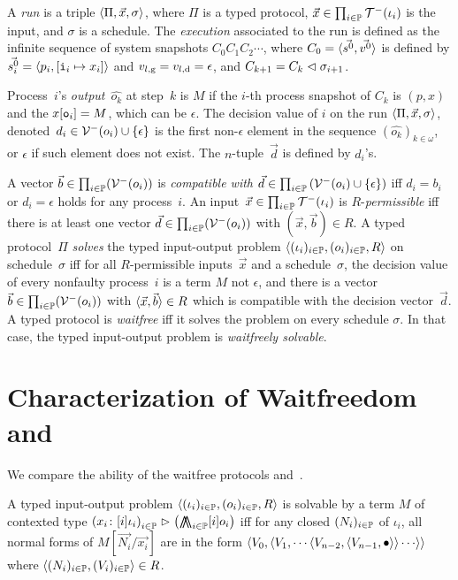 A \textit{run} is a triple $\langle{\Pi, \vec x, \sigma}\rangle$,
where $\Pi$ is a typed protocol,
$\vec x \in \prod_{i\in \mathbb{P}} \mathcal{T}^-(\iota_i)$ is the input,
and $\sigma$ is a schedule.
The \textit{execution} associated to the run
is defined as the infinite sequence of system snapshots
$C_0C_1C_2\cdots$, where $C_0 = \langle{\vec{s^0}, \vec{v^0}}\rangle$ is
defined by $\vec{s^0_i} = \langle{p_i, [\texttt{i}_i\mapsto x_i]}\rangle$ and
${v}_{l, \mathrm g}  = {v}_{l, \mathrm d} = \epsilon$,
and $C_{k+1} = C_{k}\vartriangleleft
\sigma_{i+1}$.

Process~$i$'s \textit{output}~$\hat{o_k}$ at step~$k$ is
$M$ if the $i$-th process snapshot of $C_k$ is
$(p, x)$ and the $x[\texttt{o}_i] = M$, which can be $\epsilon$.
The decision value of $i$ on the run $\langle{\Pi,\vec x,\sigma}\rangle$,
denoted~$d_i \in \mathcal{V}^-(o_i)\cup\{\epsilon\}$
 is the first non-$\epsilon$ element in the sequence
 $\left(\hat{o_k}\right)_{k\in\omega}$,
 or
$\epsilon$ if such element does not exist.
The $n$-tuple~$\vec d$ is defined by $d_i$'s.

A vector $\vec b\in \prod_{i\in \mathbb{P}}(\mathcal{V}^-(o_i))$
is \textit{compatible with} $\vec d \in \prod_{i\in
\mathbb{P}}\left(\mathcal{V}^-(o_i)\cup\{\epsilon\}\right)$ iff
$d_i = b_i$ or $d_i = \epsilon$ holds for any process~$i$.
An input~$\vec x\in \prod_{i\in \mathbb{P}}\mathcal{T}^-(\iota_i)$
is \linebreak[2] $R$-\textit{permissible} iff there is at least one
vector $\vec d\in \prod_{i\in \mathbb{P}}(\mathcal{V}^-(o_i))$ with $(\vec x, \vec b)\in R$.
A typed protocol~$\Pi$ \textit{solves} the typed input-output problem
  $\langle{(\iota_i)_{i\in \mathbb{P}}, (o_i)_{i\in \mathbb{P}}, R}\rangle$ on
schedule~$\sigma$ iff for all $R$-permissible inputs~$\vec x$ and a
schedule~$\sigma$,
 the decision value of every nonfaulty process~$i$ is a term
       $M$ not $\epsilon$, and
 there is a vector $\vec b\in \prod_{i\in \mathbb{P}}(\mathcal{V}^- (o_i))$
with $\langle{\vec x, \vec b}\rangle \in R$ which is compatible with the
 decision vector~$\vec d$.
A typed protocol is \textit{waitfree} iff it solves
the problem on every schedule $\sigma$.
In that case, the typed input-output problem is 
\textit{waitfreely solvable}.

\section{Characterization of Waitfreedom and \lgd}
\label{comparison}

We compare the ability of the waitfree protocols and \lgd\,.
\begin{definition}
 A typed input-output problem
 $\langle{(\iota_i)_{i\in \mathbb{P}}, (o_i)_{i\in \mathbb{P}}, R}\rangle$ is
 solvable by a term
 $M$ of contexted type
 $\left({x_i} \colon{[i]\iota_i}\right)_{i\in\mathbb{P}}
 \vartriangleright\left(\operatorname*{\bigwedge\kern -8pt \bigwedge}_{i\in
 \mathbb{P}}[i]o_i\right)$ 
 iff
 for any closed $(N_i)_{i\in \mathbb{P}}$ of $\iota_i$,
 all normal forms of $M[\vec{N_i}/\vec{x_i}]$
 are in the form
 $\langle{{V_0}, \langle{{V_1},
 \cdots\langle{{V_{n-2}},\langle{{V_{n-1}},\bullet}\rangle}\rangle\cdots}\rangle}\rangle$
 where $\langle{(N_i)_{i\in \mathbb{P}}, (V_i)_{i\in \mathbb{P}}}\rangle\in R$.
\end{definition}

